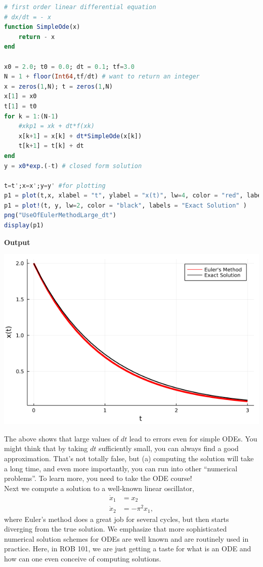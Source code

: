 \begin{lstlisting}[language=Julia,style=mystyle]
# first order linear differential equation
# dx/dt = - x
function SimpleOde(x)
    return - x
end

x0 = 2.0; t0 = 0.0; dt = 0.1; tf=3.0
N = 1 + floor(Int64,tf/dt) # want to return an integer
x = zeros(1,N); t = zeros(1,N)
x[1] = x0
t[1] = t0
for k = 1:(N-1)
    #xkp1 = xk + dt*f(xk)
    x[k+1] = x[k] + dt*SimpleOde(x[k])
    t[k+1] = t[k] + dt
end
y = x0*exp.(-t) # closed form solution

t=t';x=x';y=y' #for plotting 
p1 = plot(t,x, xlabel = "t", ylabel = "x(t)", lw=4, color = "red", labels = "Euler's Method" )
p1 = plot!(t, y, lw=2, color = "black", labels = "Exact Solution" )
png("UseOfEulerMethodLarge_dt")
display(p1)
\end{lstlisting}
\textbf{Output} 
\begin{center}
\includegraphics[width=0.6\columnwidth]{graphics/Chap09/UseOfEulerMethodLarge_dt.png}
\end{center}

The above shows that large values of $dt$ lead to errors even for simple ODEs. You might think that by taking $dt$ sufficiently small, you can always find a good approximation. That's not totally false, but (a) computing the solution will take a long time, and even more importantly, you can run into other ``numerical problems''. To learn more, you need to take the ODE course! \\

Next we compute a solution to a well-known linear oscillator,
\begin{equation}
\label{eq:LinearOscillator}
\begin{aligned}
  \dot{x}_1 &= x_2\\
  \dot{x}_2 & = -\pi^2 x_1,
\end{aligned}
\end{equation}
where Euler's method does a great job for several cycles, but then starts diverging from the true solution. We emphasize that more sophisticated numerical solution schemes for ODEs are well known and are routinely used in practice. Here, in ROB 101, we are just getting a taste for what is an ODE and how can one even conceive of computing solutions. \\

